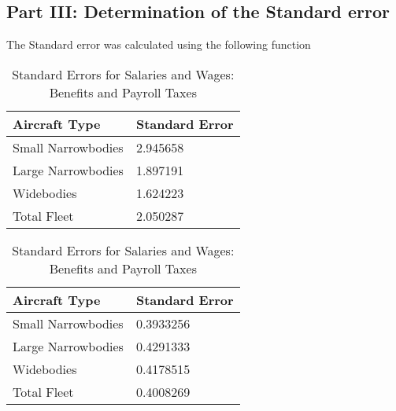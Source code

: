 \subsection{Part III: Determination of  the Standard error }

The Standard error was calculated using the following function


\begin{table}[htbp]
    \centering
    \begin{minipage}{0.45\textwidth} %
        \centering
        \caption{Standard Errors for Salaries and Wages: Pilot Training Data}
        \begin{tabular}{@{}ll@{}}
            \toprule
            \textbf{Aircraft Type} & \textbf{Standard Error} \\ \midrule
            Small Narrowbodies     & 2.945658                \\
            Large Narrowbodies     & 1.897191                \\
            Widebodies             & 1.624223                \\
            Total Fleet            & 2.050287                \\ \bottomrule
        \end{tabular}
    \end{minipage}%
    \hspace{0.05\textwidth} %
    \begin{minipage}{0.45\textwidth}
        \centering
        \caption{Standard Errors for Salaries and Wages: Benefits and Payroll Taxes}
        \begin{tabular}{@{}ll@{}}
            \toprule
            \textbf{Aircraft Type} & \textbf{Standard Error} \\ \midrule
            Small Narrowbodies     & 0.3933256               \\
            Large Narrowbodies     & 0.4291333               \\
            Widebodies             & 0.4178515               \\
            Total Fleet            & 0.4008269               \\ \bottomrule
        \end{tabular}
    \end{minipage}
\end{table}

